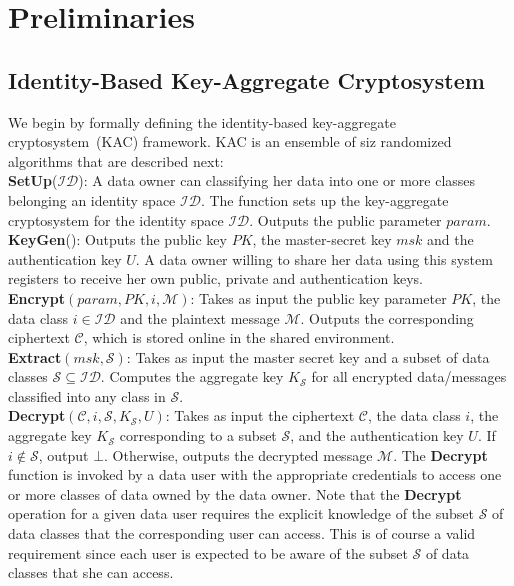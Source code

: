 \section{Preliminaries}
\label{sec:prelims}

\subsection{Identity-Based Key-Aggregate Cryptosystem}
\label{subsec:basic_framework}

We begin by formally defining the identity-based key-aggregate cryptosystem~(KAC) framework. KAC is an ensemble of siz randomized algorithms that are described next:\\

\noindent\textbf{SetUp}($\mathcal{ID}$): A data owner can classifying her data into one or more classes belonging an identity space $\mathcal{ID}$. The function sets up the key-aggregate cryptosystem for the identity space $\mathcal{ID}$. Outputs the public parameter $param$. \\

\noindent\textbf{KeyGen}(): Outputs the public key $PK$, the master-secret key $msk$ and the authentication key $U$. A data owner willing to share her data using this system registers to receive her own public, private and authentication keys.\\ 

\noindent\textbf{Encrypt}$(param,PK,i,\mathcal{M})$: Takes as input the public key parameter $PK$, the data class $i\in\mathcal{ID}$ and the plaintext message $\mathcal{M}$. Outputs the corresponding ciphertext $\mathcal{C}$, which is stored online in the shared environment.\\

\noindent\textbf{Extract}$(msk,\mathcal{S})$: Takes as input the master secret key and a subset of data classes $\mathcal{S} \subseteq\mathcal{ID}$. Computes the aggregate key $K_{\mathcal{S}}$ for all encrypted data/messages classified into any class in $\mathcal{S}$.\\

\noindent\textbf{Decrypt}$(\mathcal{C},i,\mathcal{S},K_{\mathcal{S}},U)$: Takes as input the ciphertext $\mathcal{C}$, the data class $i$, the aggregate key $K_{\mathcal{S}}$ corresponding to a subset $\mathcal{S}$, and the authentication key $U$. If $i\notin\mathcal{S}$, output $\bot$. Otherwise, outputs the decrypted message $\mathcal{M}$. The \textbf{Decrypt} function is invoked by a data user with the appropriate credentials to access one or more classes of data owned by the data owner. Note that the \textbf{Decrypt} operation for a given data user requires the explicit knowledge of the subset $\mathcal{S}$ of data classes that the corresponding user can access. This is of course a valid requirement since each user is expected to be aware of the subset $\mathcal{S}$ of data classes that she can access.

